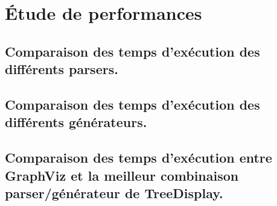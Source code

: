 \chapter{Étude de performances}

	\section{Comparaison des temps d'exécution des différents parsers.}

	\section{Comparaison des temps d'exécution des différents générateurs.}

	\section{Comparaison des temps d'exécution entre GraphViz et la meilleur combinaison parser/générateur de TreeDisplay.}